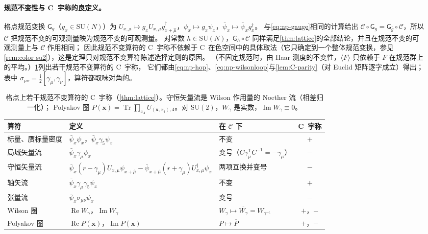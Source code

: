 \documentclass[UTF8,a4paper,11pt,fontset=fandol]{ctexart}
\theoremstyle{cplain}
\theoremstyle{cdefinition}
\theoremstyle{cremark}
\numberwithin{equation}{section}
\DeclareMathOperator{\Tr}{Tr}
\DeclareMathOperator{\Real}{Re}
\DeclareMathOperator{\Imag}{Im}
\newcommand{\tp}{\mathsf{T}}                         %
\newcommand{\Cop}{\mathcal{C}}                       %
\newcommand{\ii}{\mathrm{i}}                        %
\begin{document}
\paragraph{规范不变性与 C~宇称的良定义。}
格点规范变换 $\mathsf G_g$（$g_x\in\mathrm{SU}(N)$）为 $U_{x,\mu}\mapsto g_xU_{x,\mu}g^\dagger_{x+\hat\mu}$，$\psi_x\mapsto g_x\psi_x$，$\bar\psi_x\mapsto\bar\psi_xg_x^\dagger$。
与\cref{eq:np-gauge}相同的计算给出 $\Cop\circ\mathsf G_g=\mathsf G_{\overline g}\circ\Cop$，所以 $\Cop$ 把规范不变的可观测量映为规范不变的可观测量。
对常数 $h\in\mathrm{SU}(N)$，$\mathsf G_h\circ\Cop$ 同样满足\cref{thm:lattice}的全部结论，并且在规范不变的可观测量上与 $\Cop$ 作用相同；
因此规范不变算符的 C~宇称不依赖于 C~在色空间中的具体取法（它只确定到一个整体规范变换，参见\cref{rem:color-su2}），这是定理只对规范不变算符陈述选择定则的原因。
（不固定规范时，由 Haar 测度的不变性，$\langle F\rangle$ 只依赖于 $F$ 在规范群上的平均。）\cref{tab:np-operators}列出若干规范不变算符的 C~宇称，
它们都由\cref{eq:np-hop}、\cref{eq:np-wilsonloop}与\cref{lem:C-parity}（对 Euclid 矩阵逐字成立）得出；表中 $\sigma_{\mu\nu}=\frac{\ii}{2}[\gamma_\mu,\gamma_\nu]$，算符都取味对角的。

\begin{table}[htbp]
\centering
\caption{格点上若干规范不变算符的 C~宇称（\cref{thm:lattice}）。守恒矢量流是 Wilson 作用量的 Noether 流（相差归一化）；
Polyakov 圈 $P(\boldsymbol x)=\Tr\prod_{x_4}U_{(\boldsymbol x,x_4),4}$。对 $\mathrm{SU}(2)$，$W_\gamma$ 是实数，$\Imag W_\gamma\equiv0$。}
\label{tab:np-operators}
\small
\renewcommand{\arraystretch}{1.2}
\begin{tabularx}{\textwidth}{@{}l l >{\raggedright\arraybackslash}X c@{}}
\toprule
算符 & 定义 & 在 $\Cop$ 下 & C~宇称 \\
\midrule
标量、赝标量密度 & $\bar\psi_x\psi_x$，$\bar\psi_x\gamma_5\psi_x$ & 不变 & $+$ \\
局域矢量流 & $\bar\psi_x\gamma_\mu\psi_x$ & 变号（$C\gamma_\mu^{\tp}C^{-1}=-\gamma_\mu$） & $-$ \\
守恒矢量流 & $\bar\psi_x(r-\gamma_\mu)U_{x,\mu}\psi_{x+\hat\mu}-\bar\psi_{x+\hat\mu}(r+\gamma_\mu)U^\dagger_{x,\mu}\psi_x$ & 两项互换并变号 & $-$ \\
轴矢流 & $\bar\psi_x\gamma_\mu\gamma_5\psi_x$ & 不变 & $+$ \\
张量流 & $\bar\psi_x\sigma_{\mu\nu}\psi_x$ & 变号 & $-$ \\
Wilson 圈 & $\Real W_\gamma$，$\Imag W_\gamma$ & $W_\gamma\mapsto\overline{W_\gamma}=W_{\gamma^{-1}}$ & $+$，$-$ \\
Polyakov 圈 & $\Real P(\boldsymbol x)$，$\Imag P(\boldsymbol x)$ & $P\mapsto\overline P$ & $+$，$-$ \\
\bottomrule
\end{tabularx}
\end{table}
\end{document}

